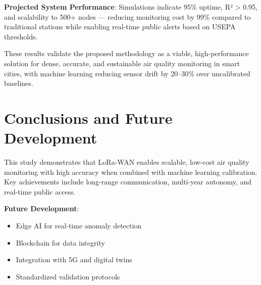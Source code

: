 \documentclass[conference]{IEEEtran}
\begin{document}
\textbf{Projected System Performance}: Simulations indicate 95\% uptime, R² > 0.95, and scalability to 500+ nodes — reducing monitoring cost by 99\% compared to traditional stations while enabling real-time public alerts based on USEPA thresholds.

These results validate the proposed methodology as a viable, high-performance solution for dense, accurate, and sustainable air quality monitoring in smart cities, with machine learning reducing sensor drift by 20--30\% over uncalibrated baselines.

\section{Conclusions and Future Development}
This study demonstrates that LoRa-WAN enables scalable, low-cost air quality monitoring with high accuracy when combined with machine learning calibration. Key achievements include long-range communication, multi-year autonomy, and real-time public access.

\textbf{Future Development}:
\begin{itemize}
    \item Edge AI for real-time anomaly detection
    \item Blockchain for data integrity
    \item Integration with 5G and digital twins
    \item Standardized validation protocols
\end{itemize}


\vspace*{114\baselineskip}


    
\end{document}
